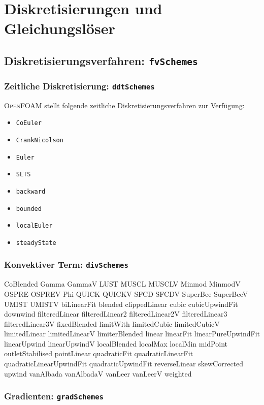 \chapter{Diskretisierungen und Gleichungslöser}

\section{Diskretisierungsverfahren: \texttt{fvSchemes}}


\subsection{Zeitliche Diskretisierung: \texttt{ddtSchemes}}

\textsc{OpenFOAM} stellt folgende zeitliche Diskretisierungsverfahren zur Verfügung:

\begin{itemize}
	\item \texttt{CoEuler}
	\item \texttt{CrankNicolson}
	\item \texttt{Euler}
	\item \texttt{SLTS}
	\item \texttt{backward}
	\item \texttt{bounded}
	\item \texttt{localEuler}
	\item \texttt{steadyState}
\end{itemize} 

\subsection{Konvektiver Term: \texttt{divSchemes}}

CoBlended
Gamma
GammaV
LUST
MUSCL
MUSCLV
Minmod
MinmodV
OSPRE
OSPREV
Phi
QUICK
QUICKV
SFCD
SFCDV
SuperBee
SuperBeeV
UMIST
UMISTV
biLinearFit
blended
clippedLinear
cubic
cubicUpwindFit
downwind
filteredLinear
filteredLinear2
filteredLinear2V
filteredLinear3
filteredLinear3V
fixedBlended
limitWith
limitedCubic
limitedCubicV
limitedLinear
limitedLinearV
limiterBlended
linear
linearFit
linearPureUpwindFit
linearUpwind
linearUpwindV
localBlended
localMax
localMin
midPoint
outletStabilised
pointLinear
quadraticFit
quadraticLinearFit
quadraticLinearUpwindFit
quadraticUpwindFit
reverseLinear
skewCorrected
upwind
vanAlbada
vanAlbadaV
vanLeer
vanLeerV
weighted


\subsection{Gradienten: \texttt{gradSchemes}}

